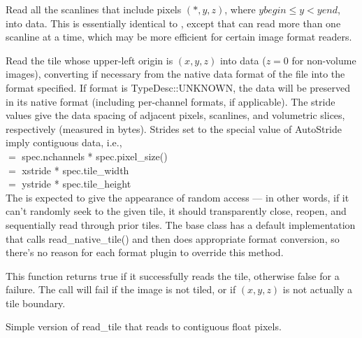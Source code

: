 Read all the scanlines that include pixels $(*,y,z)$, where
$\mathit{ybegin} \le y < \mathit{yend}$, into {\kw data}.  This is 
essentially identical to \readscanline, except that can read more than
one scanline at a time, which may be more efficient for certain image
format readers.
\apiend

Read the tile whose upper-left origin is $(x,y,z)$ into {\kw data}
($z=0$ for non-volume images),
converting if necessary from the native data format of the file into the 
{\kw format} specified.
If {\cf format} is {\cf TypeDesc::UNKNOWN}, the data will be preserved 
in its native format (including per-channel formats, if applicable).
The stride values
give the data spacing of adjacent pixels, scanlines, and volumetric
slices, respectively (measured in bytes).  Strides set to the special
value of {\kw AutoStride} imply contiguous data, i.e., \\
 $=$ {\kw spec.nchannels * spec.pixel_size()} \\
 $=$ {\kw xstride * spec.tile_width} \\
 $=$ {\kw ystride * spec.tile_height} \\
The \ImageInput is expected to give the appearance of random access
--- in other words, if it can't randomly seek to the given tile, it
should transparently close, reopen, and sequentially read through prior
tiles.  The base \ImageInput class has a default implementation
that calls {\cf read_native_tile()} and then does appropriate format conversion,
so there's no reason for each format plugin to override this method.

This function returns {\cf true} if it successfully reads the tile,
otherwise {\cf false} for a failure.
The call will fail if the image is not tiled, or if $(x,y,z)$ is not
actually a tile boundary.
\apiend


Simple version of {\kw read_tile} that reads to contiguous float pixels.
\apiend


